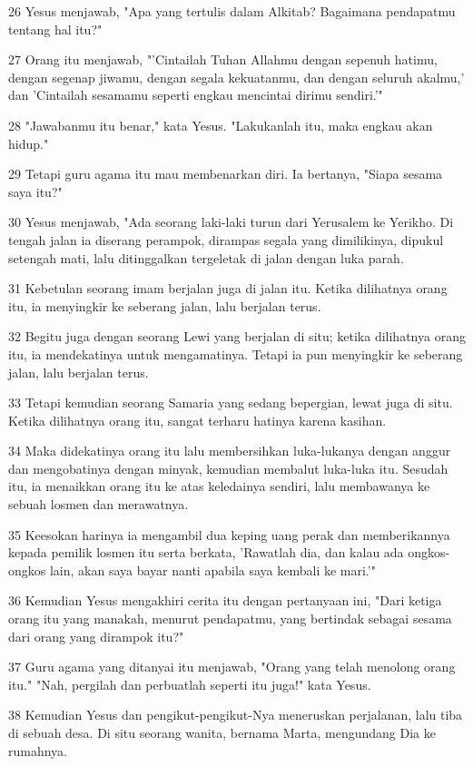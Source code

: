 \par 26 Yesus menjawab, "Apa yang tertulis dalam Alkitab? Bagaimana pendapatmu tentang hal itu?"
\par 27 Orang itu menjawab, "'Cintailah Tuhan Allahmu dengan sepenuh hatimu, dengan segenap jiwamu, dengan segala kekuatanmu, dan dengan seluruh akalmu,' dan 'Cintailah sesamamu seperti engkau mencintai dirimu sendiri.'"
\par 28 "Jawabanmu itu benar," kata Yesus. "Lakukanlah itu, maka engkau akan hidup."
\par 29 Tetapi guru agama itu mau membenarkan diri. Ia bertanya, "Siapa sesama saya itu?"
\par 30 Yesus menjawab, "Ada seorang laki-laki turun dari Yerusalem ke Yerikho. Di tengah jalan ia diserang perampok, dirampas segala yang dimilikinya, dipukul setengah mati, lalu ditinggalkan tergeletak di jalan dengan luka parah.
\par 31 Kebetulan seorang imam berjalan juga di jalan itu. Ketika dilihatnya orang itu, ia menyingkir ke seberang jalan, lalu berjalan terus.
\par 32 Begitu juga dengan seorang Lewi yang berjalan di situ; ketika dilihatnya orang itu, ia mendekatinya untuk mengamatinya. Tetapi ia pun menyingkir ke seberang jalan, lalu berjalan terus.
\par 33 Tetapi kemudian seorang Samaria yang sedang bepergian, lewat juga di situ. Ketika dilihatnya orang itu, sangat terharu hatinya karena kasihan.
\par 34 Maka didekatinya orang itu lalu membersihkan luka-lukanya dengan anggur dan mengobatinya dengan minyak, kemudian membalut luka-luka itu. Sesudah itu, ia menaikkan orang itu ke atas keledainya sendiri, lalu membawanya ke sebuah losmen dan merawatnya.
\par 35 Keesokan harinya ia mengambil dua keping uang perak dan memberikannya kepada pemilik losmen itu serta berkata, 'Rawatlah dia, dan kalau ada ongkos-ongkos lain, akan saya bayar nanti apabila saya kembali ke mari.'"
\par 36 Kemudian Yesus mengakhiri cerita itu dengan pertanyaan ini, "Dari ketiga orang itu yang manakah, menurut pendapatmu, yang bertindak sebagai sesama dari orang yang dirampok itu?"
\par 37 Guru agama yang ditanyai itu menjawab, "Orang yang telah menolong orang itu." "Nah, pergilah dan perbuatlah seperti itu juga!" kata Yesus.
\par 38 Kemudian Yesus dan pengikut-pengikut-Nya meneruskan perjalanan, lalu tiba di sebuah desa. Di situ seorang wanita, bernama Marta, mengundang Dia ke rumahnya.
